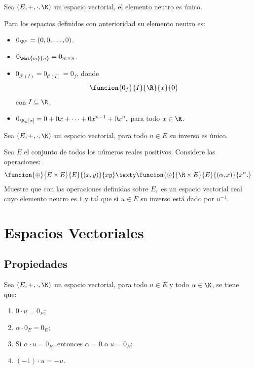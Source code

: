 \documentclass[compacto,10pt]{pubciencias-notas}
\begin{document}
\begin{prop}
Sea $(E, +, \cdot, \K)$ un espacio vectorial, el elemento neutro es único.
\end{prop}

\begin{ejem}\hspace{0pt} Para los espacios definidos con anterioridad su elemento neutro es:
\begin{itemize}
\item $0_{\R^{n}} = (0, 0, \ldots, 0)$.
\item $0_{\Mat{m}{n}} = 0_{m \times n}$.
\item $0_{\mathcal{F}(I)} = 0_{\mathcal{C}(I)} = 0_{f}$, donde
\[
    \funcion{0_{f}}{I}{\R}{x}{0}
\]
con $I\subseteq\R$.
\item $0_{\R_{n}[x]} = 0 + 0x + \cdots + 0x^{n-1} + 0x^{n},$ para todo $x\in\R$.
\end{itemize}
\end{ejem}

\begin{prop}
Sea $(E, +, \cdot, \K)$ un espacio vectorial, para todo $u\in E$ su inverso es único.
\end{prop}

\begin{ejer}\hspace{0pt} Sea $E$ el conjunto de todos los números reales positivos. Considere las operaciones:
\[
    \funcion{\oplus}{E \times E}{E}{(x, y)}{xy}
    \texty
    \funcion{\odot}{\R \times E}{E}{(\alpha, x)}{x^{\alpha}.}
\]
Muestre que con las operaciones definidas sobre $E,$ es un espacio vectorial real cuyo elemento neutro es $1$ y tal que si $u\in E$ su inverso está dado por $u^{-1}$.
\end{ejer}


\setcounter{section}{3}
\section{Espacios Vectoriales}
\setcounter{subsection}{1}
\subsection{Propiedades}

\begin{teo}
Sea $(E,+,\cdot,\K)$ un espacio vectorial, para todo $u \in E$ y todo $\alpha \in \K$, se tiene que:
\begin{enumerate}
\item $0\cdot u = 0_{E}$;
\item $\alpha \cdot 0_{E} = 0_{E}$;
\item Si $\alpha \cdot u=0_{E}$, entonces $\alpha  = 0$ o $u = 0_{E}$;
\item $(-1) \cdot u = -u$.
\end{enumerate}
\end{teo}
\end{document}
